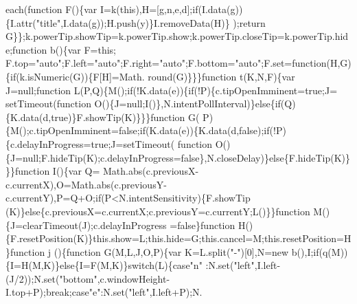 \begin{DoxyCode}
{      each(\textcolor{keyword}{function} F()\{var I=k(\textcolor{keyword}{this}),H=[g,n,e,d];\textcolor{keywordflow}{if}(I.data(g))\{I.attr(\textcolor{stringliteral}{"title"},I.data(g));H.push(y)\}I.removeData(H)\}
      );\textcolor{keywordflow}{return} G\}\};k.powerTip.showTip=k.powerTip.show;k.powerTip.closeTip=k.powerTip.hide;\textcolor{keyword}{function} b()\{var F=\textcolor{keyword}{this};
      F.top=\textcolor{stringliteral}{"auto"};F.left=\textcolor{stringliteral}{"auto"};F.right=\textcolor{stringliteral}{"auto"};F.bottom=\textcolor{stringliteral}{"auto"};F.set=\textcolor{keyword}{function}(H,G)\{\textcolor{keywordflow}{if}(k.isNumeric(G))\{F[H]=Math.
      round(G)\}\}\}\textcolor{keyword}{function} t(K,N,F)\{var J=null;\textcolor{keyword}{function} L(P,Q)\{M();\textcolor{keywordflow}{if}(!K.data(e))\{\textcolor{keywordflow}{if}(!P)\{c.tipOpenImminent=\textcolor{keyword}{true};J=
      setTimeout(\textcolor{keyword}{function} O()\{J=null;I()\},N.intentPollInterval)\}\textcolor{keywordflow}{else}\{\textcolor{keywordflow}{if}(Q)\{K.data(d,\textcolor{keyword}{true})\}F.showTip(K)\}\}\}\textcolor{keyword}{function} G(
      P)\{M();c.tipOpenImminent=\textcolor{keyword}{false};\textcolor{keywordflow}{if}(K.data(e))\{K.data(d,\textcolor{keyword}{false});\textcolor{keywordflow}{if}(!P)\{c.delayInProgress=\textcolor{keyword}{true};J=setTimeout(\textcolor{keyword}{
      function} O()\{J=null;F.hideTip(K);c.delayInProgress=\textcolor{keyword}{false}\},N.closeDelay)\}\textcolor{keywordflow}{else}\{F.hideTip(K)\}\}\}\textcolor{keyword}{function} I()\{var Q=
      Math.abs(c.previousX-c.currentX),O=Math.abs(c.previousY-c.currentY),P=Q+O;\textcolor{keywordflow}{if}(P<N.intentSensitivity)\{F.showTip
      (K)\}\textcolor{keywordflow}{else}\{c.previousX=c.currentX;c.previousY=c.currentY;L()\}\}\textcolor{keyword}{function} M()\{J=clearTimeout(J);c.delayInProgress
      =\textcolor{keyword}{false}\}\textcolor{keyword}{function} H()\{F.resetPosition(K)\}this.show=L;this.hide=G;this.cancel=M;this.resetPosition=H\}\textcolor{keyword}{function} j
      ()\{\textcolor{keyword}{function} G(M,L,J,O,P)\{var K=L.split(\textcolor{stringliteral}{"-"})[0],N=\textcolor{keyword}{new} b(),I;\textcolor{keywordflow}{if}(q(M))\{I=H(M,K)\}\textcolor{keywordflow}{else}\{I=F(M,K)\}\textcolor{keywordflow}{switch}(L)\{\textcolor{keywordflow}{case}\textcolor{stringliteral}{"n"}
      :N.set(\textcolor{stringliteral}{"left"},I.left-(J/2));N.set(\textcolor{stringliteral}{"bottom"},c.windowHeight-I.top+P);\textcolor{keywordflow}{break};\textcolor{keywordflow}{case}\textcolor{stringliteral}{"e"}:N.set(\textcolor{stringliteral}{"left"},I.left+P);N.
}
\end{DoxyCode}
